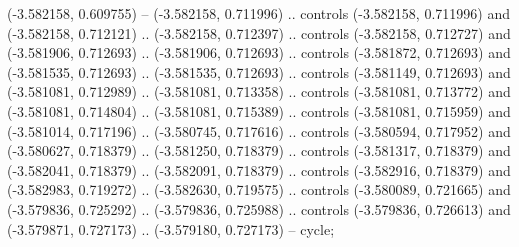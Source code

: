     (-3.582158, 0.609755) --
    (-3.582158, 0.711996) .. controls (-3.582158, 0.711996) and (-3.582158, 0.712121) ..
    (-3.582158, 0.712397) .. controls (-3.582158, 0.712727) and (-3.581906, 0.712693) ..
    (-3.581906, 0.712693) .. controls (-3.581872, 0.712693) and (-3.581535, 0.712693) ..
    (-3.581535, 0.712693) .. controls (-3.581149, 0.712693) and (-3.581081, 0.712989) ..
    (-3.581081, 0.713358) .. controls (-3.581081, 0.713772) and (-3.581081, 0.714804) ..
    (-3.581081, 0.715389) .. controls (-3.581081, 0.715959) and (-3.581014, 0.717196) ..
    (-3.580745, 0.717616) .. controls (-3.580594, 0.717952) and (-3.580627, 0.718379) ..
    (-3.581250, 0.718379) .. controls (-3.581317, 0.718379) and (-3.582041, 0.718379) ..
    (-3.582091, 0.718379) .. controls (-3.582916, 0.718379) and (-3.582983, 0.719272) ..
    (-3.582630, 0.719575) .. controls (-3.580089, 0.721665) and (-3.579836, 0.725292) ..
    (-3.579836, 0.725988) .. controls (-3.579836, 0.726613) and (-3.579871, 0.727173) ..
    (-3.579180, 0.727173) --
    cycle;

